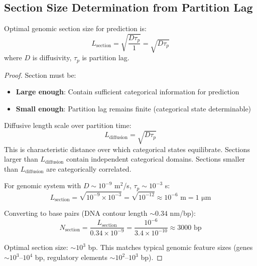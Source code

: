 \subsection{Section Size Determination from Partition Lag}

\begin{theorem}
\label{thm:optimal_section_size}
Optimal genomic section size for prediction is:
\begin{equation}
L_{\text{section}} = \sqrt{\frac{D\tau_p}{1}} = \sqrt{D\tau_p}
\end{equation}
where $D$ is diffusivity, $\tau_p$ is partition lag.
\end{theorem}

\begin{proof}
Section must be:
\begin{itemize}
\item \textbf{Large enough}: Contain sufficient categorical information for prediction
\item \textbf{Small enough}: Partition lag remains finite (categorical state determinable)
\end{itemize}

Diffusive length scale over partition time:
\begin{equation}
L_{\text{diffusion}} = \sqrt{D\tau_p}
\end{equation}
This is characteristic distance over which categorical states equilibrate. Sections larger than $L_{\text{diffusion}}$ contain independent categorical domains. Sections smaller than $L_{\text{diffusion}}$ are categorically correlated.

For genomic system with $D \sim 10^{-9}$ m$^2$/s, $\tau_p \sim 10^{-3}$ s:
\begin{equation}
L_{\text{section}} = \sqrt{10^{-9} \times 10^{-3}} = \sqrt{10^{-12}} \approx 10^{-6} \text{ m} = 1 \text{ μm}
\end{equation}

Converting to base pairs (DNA contour length $\sim 0.34$ nm/bp):
\begin{equation}
N_{\text{section}} = \frac{L_{\text{section}}}{0.34 \times 10^{-9}} = \frac{10^{-6}}{3.4 \times 10^{-10}} \approx 3000 \text{ bp}
\end{equation}

Optimal section size: $\sim 10^3$ bp. This matches typical genomic feature sizes (genes $\sim 10^3$--$10^4$ bp, regulatory elements $\sim 10^2$--$10^3$ bp).
\end{proof}

